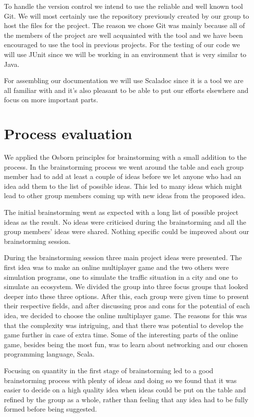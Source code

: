 \documentclass[a4paper]{article}
\begin{document}
To handle the version control we intend to use the reliable and well known tool Git. We will most certainly use the repository previously created by our group to host the files for the project. The reason we chose Git was mainly because all of the members of the project are well acquainted with the tool and we have been encouraged to use the tool in previous projects.
For the testing of our code we will use JUnit since we will be working in an environment that is very similar to Java.

For assembling our documentation we will use Scaladoc since it is a tool we are all familiar with and it’s also pleasant to be able to put our efforts elsewhere and focus on more important parts. 

\section{Process evaluation}
We applied the Osborn principles for brainstorming with a small addition to the process. In the brainstorming process we went around the table and each group member had to add at least a couple of ideas before we let anyone who had an idea add them to the list of possible ideas. This led to many ideas which might lead to other group members coming up with new ideas from the proposed idea.

The initial brainstorming went as expected with a long list of possible project ideas as the result. No ideas were criticised during the brainstorming and all the group members' ideas were shared. Nothing specific could be improved about our brainstorming session. 

During the brainstorming session three main project ideas were presented. The first idea was to make an online multiplayer game and the two others were simulation programs, one to simulate the traffic situation in a city and one to simulate an ecosystem. We divided the group into three focus groups that looked deeper into these three options. After this, each group were given time to present their respective fields, and after discussing pros and cons for the potential of each idea, we decided to choose the online multiplayer game. The reasons for this was that the complexity was intriguing, and that there was potential to develop the game further in case of extra time. Some of the interesting parts of the online game, besides being the most fun, was to learn about networking and our chosen programming language, Scala. 

Focusing on quantity in the first stage of brainstorming led to a good brainstorming process with plenty of ideas and doing so we found that it was easier to decide on a high quality idea when ideas could be put on the table and refined by the group as a whole, rather than feeling that any idea had to be fully formed before being suggested.
\end{document}
